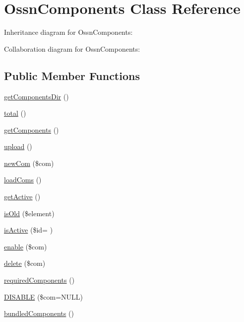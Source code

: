 \hypertarget{class_ossn_components}{}\section{Ossn\+Components Class Reference}
\label{class_ossn_components}


Inheritance diagram for Ossn\+Components\+:


Collaboration diagram for Ossn\+Components\+:
\subsection*{Public Member Functions}
\begin{DoxyCompactItemize}
\item 
\hyperlink{class_ossn_components_a065daec904a24ecf744d619534010106}{get\+Components\+Dir} ()
\item 
\hyperlink{class_ossn_components_a9efa17b570797933c7c5b0c68f743a55}{total} ()
\item 
\hyperlink{class_ossn_components_a58578bfd54ea406d5c802fa4e2641c64}{get\+Components} ()
\item 
\hyperlink{class_ossn_components_a160ae63d11b56d3190b172facb43a343}{upload} ()
\item 
\hyperlink{class_ossn_components_af92f59e7eb3eea7b3da5ad2c108cd899}{new\+Com} (\$com)
\item 
\hyperlink{class_ossn_components_a7b810b6c37ce59abc852efb67da8cda6}{load\+Coms} ()
\item 
\hyperlink{class_ossn_components_af9a93395c78e42f0b728d62326e42feb}{get\+Active} ()
\item 
\hyperlink{class_ossn_components_a83d2313da2728566ccc913f0c3a503c8}{is\+Old} (\$element)
\item 
\hyperlink{class_ossn_components_a14b862bdde31a2ae057f535365b89142}{is\+Active} (\$id= \textquotesingle{}\textquotesingle{})
\item 
\hyperlink{class_ossn_components_a67f67365724214960116e310e025d12a}{enable} (\$com)
\item 
\hyperlink{class_ossn_components_a0eff8be9e63968995ec84eaaf0d55d66}{delete} (\$com)
\item 
\hyperlink{class_ossn_components_a438c9bf0898c2c30d5b74b84c52e8ffe}{required\+Components} ()
\item 
\hyperlink{class_ossn_components_a9caf6936a672ca4e2f6c2680f8ff45ad}{D\+I\+S\+A\+B\+LE} (\$com=N\+U\+LL)
\item 
\hyperlink{class_ossn_components_a675f368b8cae7eab90faa6e10d273e5f}{bundled\+Components} ()

\end{DoxyCompactItemize}

